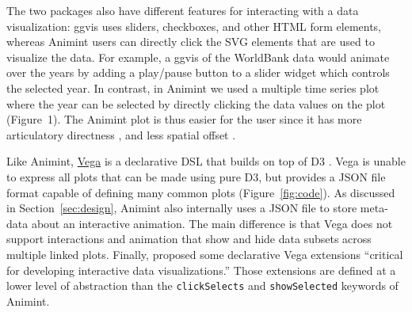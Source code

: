 \documentclass[10pt,journal,compsoc]{IEEEtran}\usepackage[]{graphicx}\usepackage[]{color}
\begin{document}


The two packages also have different features for interacting with a
data visualization: ggvis uses sliders, checkboxes, and other HTML
form elements, whereas Animint users can directly click the SVG
elements that are used to visualize the data. For example, a ggvis of
the WorldBank data would animate over the years by adding a play/pause
button to a slider widget which controls the selected year. In
contrast, in Animint we used a multiple time series plot where the
year can be selected by directly clicking the data values on the plot
(Figure~1). The Animint plot is thus easier for the user since it has
more articulatory directness \citep{Hutchins:1985}, and less spatial
offset \citep{instrumental-interaction}.

Like Animint, \href{http://trifacta.github.io/vega/}{Vega} is a
declarative DSL that builds on top of D3 \citep{vega}. Vega is unable
to express all plots that can be made using pure D3, but provides a
JSON file format capable of defining many common plots
(Figure~\ref{fig:code}). As discussed in Section~\ref{sec:design},
Animint also internally uses a JSON file to store meta-data about an
interactive animation. The main difference
is that Vega does not support interactions and animation that show and hide
data subsets across multiple linked plots. Finally,
\citet{2014-reactive-vega} proposed some declarative Vega
extensions ``critical for developing interactive data
visualizations.''  Those extensions are defined at a lower level of
abstraction than the \texttt{clickSelects} and \texttt{showSelected}
keywords of Animint.
\end{document}
